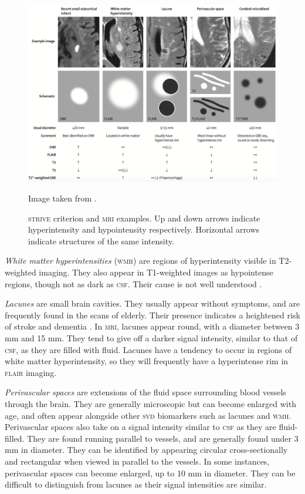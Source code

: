 \begin{figure}[ht]
	\centering
	\includegraphics[width = \textwidth]{Images/2_STRIVE.png}
	\caption{\textsc{strive} criterion and \textsc{mri} examples. Up and down arrows indicate hyperintensity and hypointensity respectively. Horizontal arrows indicate structures of the same intensity.}
	\small Image taken from \cite{WardlawJ.M.2013Nsfr}.
	\label{svd-biomarkers-fig}
\end{figure}

\textit{White matter hyperintensities} (\textsc{wmh}) are regions of hyperintensity visible in T2-weighted imaging. They also appear in T1-weighted images as hypointense regions, though not as dark as \textsc{csf}. Their cause is not well understood \citep{Gouw2011}.

\textit{Lacunes} are small brain cavities. They usually appear without symptoms, and are frequently found in the scans of elderly. Their presence indicates a heightened risk of stroke and dementia \citep{BenjaminJ.Philip2018LIbN, VanDerFlierM.Wiesje2005SVDa}. In \textsc{mri}, lacunes appear round, with a diameter between 3 mm and 15 mm. They tend to give off a darker signal intensity, similar to that of \textsc{csf}, as they are filled with fluid. Lacunes have a tendency to occur in regions of white matter hyperintensity, so they will frequently have a hyperintense rim in \textsc{flair} imaging.

\textit{Perivascular spaces} are extensions of the fluid space surrounding blood vessels through the brain. They are generally microscopic but can become enlarged with age, and often appear alongside other \textsc{svd} biomarkers such as lacunes and \textsc{wmh}. Perivascular spaces also take on a signal intensity similar to \textsc{csf} as they are fluid-filled. They are found running parallel to vessels, and are generally found under 3 mm in diameter. They can be identified by appearing circular cross-sectionally and rectangular when viewed in parallel to the vessels. In some instances, perivascular spaces can become enlarged, up to 10 mm in diameter. They can be difficult to distinguish from lacunes as their signal intensities are similar.

